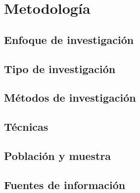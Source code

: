 \section{Metodología}

\subsection{Enfoque de investigación}

\subsection{Tipo de investigación}

\subsection{Métodos de investigación}

\subsection{Técnicas}

\subsection{Población y muestra}

\subsection{Fuentes de información}
